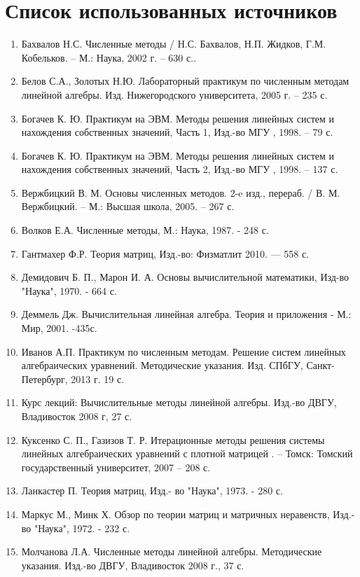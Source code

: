 \section{Список использованных источников}
    \begin{enumerate}
        \setlength{\itemsep}{0em}
        \item Бахвалов Н.С. Численные методы / Н.С. Бахвалов, Н.П. Жидков, Г.М. Кобельков. – М.: Наука, 2002 г. – 630 с..
        \item Белов С.А., Золотых Н.Ю. Лабораторный практикум по численным методам линейной алгебры. Изд. Нижегородского университета, 2005 г. – 235 с.
        \item Богачев К. Ю. Практикум на ЭВМ. Методы решения линейных систем и нахождения собственных значений, Часть 1, Изд.-во МГУ , 1998. – 79 с.
        \item Богачев К. Ю. Практикум на ЭВМ. Методы решения линейных систем и нахождения собственных значений, Часть 2, Изд.-во МГУ , 1998. – 137 с.
        \item Вержбицкий В. М. Основы численных методов. 2-e изд., перераб. / В. М. Вержбицкий. – М.: Высшая школа, 2005. – 267 с.
        \item Волков Е.А. Численные методы, М.: Наука, 1987. - 248 с.
        \item Гантмахер Ф.Р. Теория матриц, Изд.-во: Физматлит 2010. — 558 с.
        \item Демидович Б. П., Марон И. А. Основы вычислительной математики, Изд-во "Наука", 1970. - 664 с.
        \item Деммель Дж. Вычислительная линейная алгебра. Теория и приложения - М.: Мир, 2001. -435с.
        \item Иванов А.П. Практикум по численным методам. Решение систем линейных алгебраических уравнений. Методические указания. Изд. СПбГУ, Санкт-Петербург, 2013 г. 19 с.
        \item Курс лекций: Вычислительные методы линейной алгебры. Изд.-во ДВГУ, Владивосток 2008 г, 27 с.
        \item Куксенко С. П., Газизов Т. Р. Итерационные методы решения системы линейных алгебраических уравнений с плотной матрицей . – Томск: Томский государственный университет, 2007 – 208 с.
        \item Ланкастер П. Теория матриц, Изд.- во "Наука", 1973. - 280 с.
        \item Маркус М., Минк Х. Обзор по теории матриц и матричных неравенств, Изд.- во "Наука", 1972. - 232 с.
        \item Молчанова Л.А. Численные методы линейной алгебры. Методические указания. Изд.-во ДВГУ, Владивосток 2008 г., 37 с. \label{3.15}

\end{enumerate}
